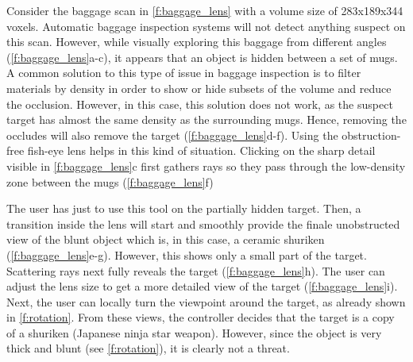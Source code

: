 Consider the baggage scan in \autoref{f:baggage_lens} with a volume size of 283x189x344 voxels. Automatic baggage inspection systems will not detect anything suspect on this scan. However, while visually exploring this baggage from different angles (\autoref{f:baggage_lens}a-c), it appears that an object is hidden between a set of mugs. A common solution to this type of issue in baggage inspection is to filter materials by density in order to show or hide subsets of the volume and reduce the occlusion. However, in this case, this solution does not work, as the suspect target has almost the same density as the surrounding mugs. Hence, removing the occludes will also remove the target (\autoref{f:baggage_lens}d-f). Using the obstruction-free fish-eye lens helps in this kind of situation. Clicking on the sharp detail visible in \autoref{f:baggage_lens}c first gathers rays so they pass through the low-density zone between the mugs (\autoref{f:baggage_lens}f)

The user has just to use this tool on the partially hidden target. Then, a transition inside the lens will start and smoothly provide the finale unobstructed view of the blunt object which is, in this case, a ceramic shuriken (\autoref{f:baggage_lens}e-g). However, this shows only a small part of the target. Scattering rays next fully reveals the target (\autoref{f:baggage_lens}h). The user can adjust the lens size to get a more detailed view of the target (\autoref{f:baggage_lens}i). Next, the user can locally turn the viewpoint around the target, as already shown in \autoref{f:rotation}. From these views, the controller decides that the target is a copy of a shuriken (Japanese ninja star weapon). However, since the object is very thick and blunt (see \autoref{f:rotation}), it is clearly not a threat.

